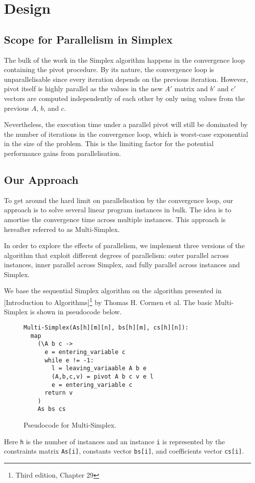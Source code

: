 \section{Design}

\subsection{Scope for Parallelism in Simplex}
The bulk of the work in the Simplex algorithm happens in the convergence loop containing the pivot procedure. By its nature, the convergence loop is unparallelisable since every iteration depends on the previous iteration. However, pivot itself is highly parallel as the values in the new $A'$ matrix and $b'$ and $c'$ vectors are computed independently of each other by only using values from the previous $A$, $b$, and $c$.

Nevertheless, the execution time under a parallel pivot will still be dominated by the number of iterations in the convergence loop, which is worst-case exponential in the size of the problem. This is the limiting factor for the potential performance gains from parallelisation.

\subsection{Our Approach}
To get around the hard limit on parallelisation by the convergence loop, our approach is to solve several linear program instances in bulk. The idea is to amortise the convergence time across multiple instances. This approach is hereafter referred to as Multi-Simplex.

In order to explore the effects of parallelism, we implement three versions of the algorithm that exploit different degrees of parallelism: outer parallel across instances, inner parallel across Simplex, and fully parallel across instances and Simplex.

We base the sequential Simplex algorithm on the algorithm presented in [Introduction to Algorithms]\footnote{Third edition, Chapter 29} by Thomas H. Cormen et al. The basic Multi-Simplex is shown in pseudocode below.

\begin{figure}[H]
\label{code:multi-simplex}
\begin{verbatim}
Multi-Simplex(As[h][m][n], bs[h][m], cs[h][n]):
  map
    (\A b c ->
      e = entering_variable c
      while e != -1:
        l = leaving_variaable A b e
        (A,b,c,v) = pivot A b c v e l
        e = entering_variable c
      return v
    )
    As bs cs
\end{verbatim}
\caption{Pseudocode for Multi-Simplex.}
\end{figure}
Here \texttt{h} is the number of instances and an instance \texttt{i} is represented by the constraints matrix \texttt{As[i]}, constants vector \texttt{bs[i]}, and coefficients vector \texttt{cs[i]}.

